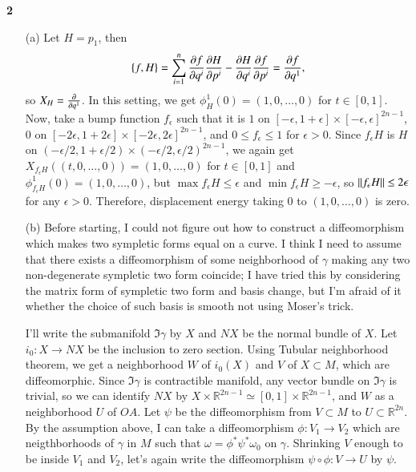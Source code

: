 \documentclass[a4paper, 12pt]{article}
\theoremstyle{Mydefinition}
\theoremstyle{Mytheorem}
\begin{document}
\noindent \textbf{2}
\begin{enumerate}
    \item[(a)] Let $H = p_1$, then
    \begin{equation*}
        \{f, H\} = \sum_{i=1}^n \pdv{f}{q^i}\pdv{H}{p^i} - \pdv{H}{q^i}\pdv{f}{p^i} = \pdv{f}{q^1},
    \end{equation*}
    so $X_H = \pdv{q^1}$. In this setting, we get $\phi^1_H(0) = (1, 0, \ldots, 0)$ for $t\in[0,1]$. Now, take a bump function $f_\epsilon$ such that it is $1$ on $[-\epsilon, 1+\epsilon]\times [-\epsilon, \epsilon]^{2n-1}$, $0$ on $[-2\epsilon, 1+2\epsilon]\times [-2\epsilon, 2\epsilon]^{2n-1}$, and $0\leq f_\epsilon\leq 1$ for $\epsilon>0$. Since $f_\epsilon H$ is $H$ on $(-\epsilon/2, 1+\epsilon/2)\times (-\epsilon/2, \epsilon/2)^{2n-1}$, we again get $X_{f_\epsilon H}((t,0,\ldots, 0)) = (1,0,\ldots, 0)$ for $t\in[0,1]$ and $\phi^1_{f_\epsilon H}(0) = (1, 0, \ldots, 0)$, but $\max f_\epsilon H\leq \epsilon$ and $\min f_\epsilon H \geq -\epsilon$, so $\norm{f_\epsilon H}\leq 2\epsilon$ for any $\epsilon>0$. Therefore, displacement energy taking $0$ to $(1,0,\ldots, 0)$ is zero.
    
    \item[(b)] Before starting, I could not figure out how to construct a diffeomorphism which makes two sympletic forms equal on a curve. I think I need to assume that there exists a diffeomorphism of some neighborhood of $\gamma$ making any two non-degenerate sympletic two form coincide; I have tried this by considering the matrix form of sympletic two form and basis change, but I'm afraid of it whether the choice of such basis is smooth not using Moser's trick.
    
    I'll write the submanifold $\Im \gamma$ by $X$ and $NX$ be the normal bundle of $X$. Let $i_0:X\rightarrow NX$ be the inclusion to zero section. Using Tubular neighborhood theorem, we get a neighborhood $W$ of $i_0(X)$ and $V$ of $X\subset M$, which are diffeomorphic. Since $\Im\gamma$ is contractible manifold, any vector bundle on $\Im\gamma$ is trivial, so we can identify $NX$ by $X\times \mathbb{R}^{2n-1}\simeq [0,1]\times \mathbb{R}^{2n-1}$, and $W$ as a neighborhood $U$ of $OA$. Let $\psi$ be the diffeomorphism from $V\subset M$ to $U\subset \mathbb{R}^{2n}$. By the assumption above, I can take a diffeomorphism $\phi:V_1\rightarrow V_2$ which are neigthborhoods of $\gamma$ in $M$ such that $ \omega = \phi^*\psi^*\omega_0$ on $\gamma$. Shrinking $V$ enough to be inside $V_1$ and $V_2$, let's again write the diffeomorphism $\psi\circ\phi:V\rightarrow U$ by $\psi$.
    

\end{enumerate}
\end{document}
